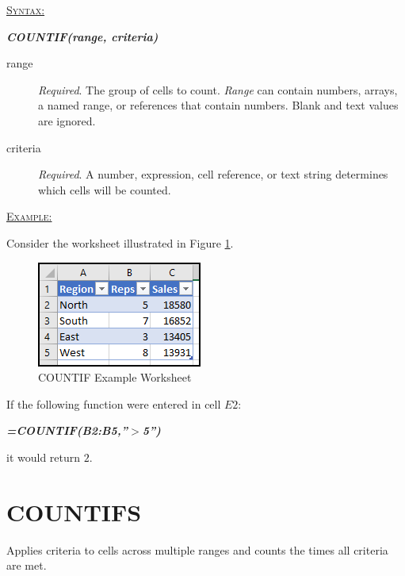 \begin{addmargin}[1cm]{0cm}

	\medskip
	\underline{\textsc{Syntax:}}
	\medskip

	{\color{Syntax}
		\noindent\textbf{\textit{COUNTIF(range, criteria)}}
	}
	
	\begin{description}
		\item[range] \textit{Required}. The group of cells to count. \textit{Range} can contain numbers, arrays, a named range, or references that contain numbers. Blank and text values are ignored.
		\item[criteria] \textit{Required}. A number, expression, cell reference, or text string determines which cells will be counted.
	\end{description}

	\medskip
	\noindent\underline{\textsc{Example:}}
	\medskip
	
	\noindent Consider the worksheet illustrated in Figure \ref{apa:cif}.

	\begin{figure}[H]
		\centering
		\includegraphics[width=\maxwidth{.45\linewidth}]{gfx/apa_fig01}
		\caption{COUNTIF Example Worksheet}
		\label{apa:cif}
	\end{figure}
	
	\noindent If the following function were entered in cell $ E2 $:
	
	{\color{Syntax}
		\textit{\textbf{=COUNTIF(B2:B5,''$ > $5'')}}
	}

	\noindent it would return $ 2 $.

\end{addmargin}

\section{COUNTIFS}

Applies criteria to cells across multiple ranges and counts the times all criteria are met.

